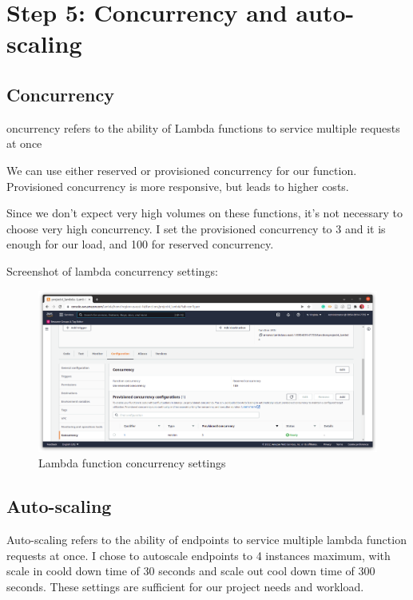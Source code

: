 \documentclass[a4paper
]{article}
\begin{document}
\newpage

\hypertarget{step-5-concurrency-and-auto-scaling}{%
\section{Step 5: Concurrency and
auto-scaling}\label{step-5-concurrency-and-auto-scaling}}

\hypertarget{concurrency}{%
\subsection{Concurrency}\label{concurrency}}

oncurrency refers to the ability of Lambda functions to service multiple
requests at once

We can use either reserved or provisioned concurrency for our function.
Provisioned concurrency is more responsive, but leads to higher costs.

Since we don't expect very high volumes on these functions, it's not
necessary to choose very high concurrency. I set the provisioned
concurrency to 3 and it is enough for our load, and 100 for reserved
concurrency.

Screenshot of lambda concurrency settings:

\begin{figure}[H]
\centering
\includegraphics{../screenshots/05_lambda-concurrency.png}
\caption{Lambda function concurrency settings}
\end{figure}

\hypertarget{auto-scaling}{%
\subsection{Auto-scaling}\label{auto-scaling}}

Auto-scaling refers to the ability of endpoints to service multiple
lambda function requests at once. I chose to autoscale endpoints to 4
instances maximum, with scale in coold down time of 30 seconds and scale
out cool down time of 300 seconds. These settings are sufficient for our
project needs and workload.
\end{document}
